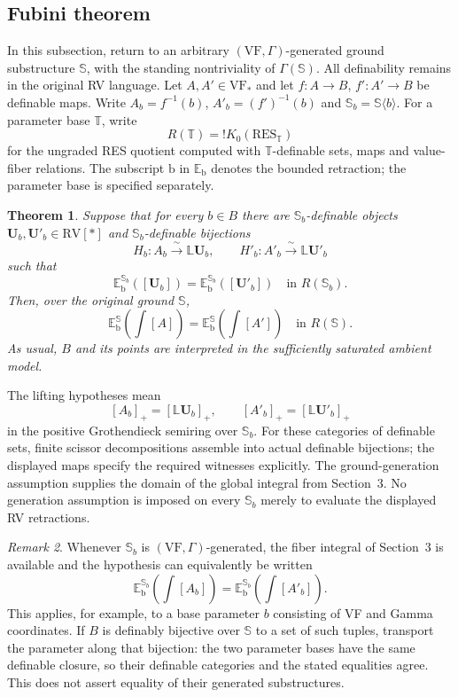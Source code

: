 \documentclass[12pt]{amsart}
\newtheorem{thm}{Theorem}[section]
\theoremstyle{remark}
\newtheorem{rem}[thm]{Remark}
\theoremstyle{definition}
\newcommand{\RV}{\mathrm{RV}}
\newcommand{\RES}{\mathrm{RES}}
\newcommand{\VF}{\mathrm{VF}}
\newcommand{\Sbase}{\mathbb S}
\numberwithin{equation}{section}
\theoremstyle{plain}
\newcommand{\Sfiber}{\mathbb S_b}
\newcommand{\Rbase}[1]{{!K_0(\RES_{#1})}}
\begin{document}
{\color{ProposalOrange}
\subsection{Fubini theorem}
In this subsection, return to an arbitrary
$(\VF,\Gamma)$-generated ground substructure $\Sbase$,
with the standing nontriviality of $\Gamma(\Sbase)$.
All definability remains in the original RV language.
Let $A,A'\in\VF_*$ and let
$f:A\to B$, $f':A'\to B$ be definable maps.
Write $A_b=f^{-1}(b)$, $A'_b=(f')^{-1}(b)$ and
$\Sfiber=\Sbase\langle b\rangle$.
For a parameter base $\mathbb T$, write
\[
 R(\mathbb T)=\Rbase{\mathbb T}
\]
for the ungraded RES quotient computed with
$\mathbb T$-definable sets, maps and value-fiber relations.
The subscript $\mathrm b$ in $\mathbb E_{\mathrm b}$ denotes
the bounded retraction; the parameter base is specified
separately.

\begin{thm}\label{fubini}
Suppose that for every $b\in B$ there are
$\Sfiber$-definable objects
$\bm U_b,\bm U'_b\in\RV[*]$ and
$\Sfiber$-definable bijections
\[
 H_b:A_b\xrightarrow{\ \sim\ }\mathbb L\bm U_b,
 \qquad
 H'_b:A'_b\xrightarrow{\ \sim\ }\mathbb L\bm U'_b
\]
such that
\[
 \mathbb E_{\mathrm b}^{\Sfiber}([\bm U_b])
 =
 \mathbb E_{\mathrm b}^{\Sfiber}([\bm U'_b])
 \quad\text{in }R(\Sfiber).
\]
Then, over the original ground $\Sbase$,
\[
 \mathbb E_{\mathrm b}^{\Sbase}\!\left(\int[A]\right)
 =
 \mathbb E_{\mathrm b}^{\Sbase}\!\left(\int[A']\right)
 \quad\text{in }R(\Sbase).
\]
As usual, $B$ and its points are interpreted in the sufficiently
saturated ambient model.
\end{thm}

The lifting hypotheses mean
\[
 [A_b]_+=[\mathbb L\bm U_b]_+,\qquad
 [A'_b]_+=[\mathbb L\bm U'_b]_+
\]
in the positive Grothendieck semiring over $\Sfiber$.
For these categories of definable sets, finite scissor
decompositions assemble into actual definable bijections;
the displayed maps specify the required witnesses explicitly.
The ground-generation assumption supplies the domain of
the global integral from Section~3.
No generation assumption is imposed on every $\Sfiber$
merely to evaluate the displayed RV retractions.

\begin{rem}\label{rem:volb}
Whenever $\Sfiber$ is $(\VF,\Gamma)$-generated, the fiber
integral of Section~3 is available and the hypothesis can
equivalently be written
\[
 \mathbb E_{\mathrm b}^{\Sfiber}
       \!\left(\int[A_b]\right)
 =
 \mathbb E_{\mathrm b}^{\Sfiber}
       \!\left(\int[A'_b]\right).
\]
This applies, for example, to a base parameter $b$ consisting
of VF and Gamma coordinates.
If $B$ is definably bijective over $\Sbase$ to a set of such
tuples, transport the parameter along that bijection:
the two parameter bases have the same definable closure,
so their definable categories and the stated equalities agree.
This does not assert equality of their generated substructures.
\end{rem}

}
\end{document}
